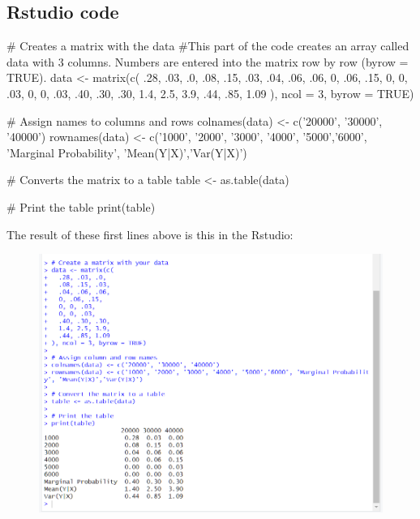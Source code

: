 \documentclass{article}
\begin{document}
\subsection{Rstudio code}
\begin{spverbatim}

# Creates a matrix with the data
#This part of the code creates an array called data with 3 columns. Numbers are entered into the matrix row by row (byrow = TRUE).
data <- matrix(c(
  .28, .03, .0,
  .08, .15, .03,
  .04, .06, .06,
  0, .06, .15,
  0, 0, .03,
  0, 0, .03,
  .40, .30, .30,
  1.4, 2.5, 3.9,
  .44, .85, 1.09
), ncol = 3, byrow = TRUE)

# Assign names to columns and rows
colnames(data) <- c('20000', '30000', '40000')
rownames(data) <- c('1000', '2000', '3000', '4000', '5000','6000', 'Marginal Probability', 'Mean(Y|X)','Var(Y|X)')

# Converts the matrix to a table
table <- as.table(data)

# Print the table
print(table)
\end{spverbatim}
The result of these first lines above is this in the Rstudio:
\begin{figure}[H]
    \centering
    \includegraphics[width=1\linewidth]{imagesfolder/image24.png}
\end{figure}
\end{document}
